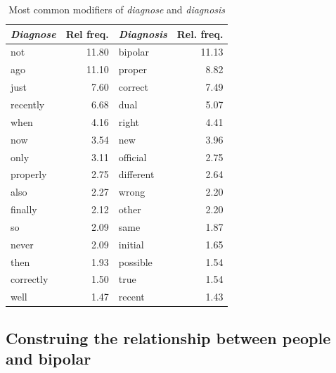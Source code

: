 \begin{table}[htb]
\begin{tabular}{lrlr}

\toprule
\emph{Diagnose}  & Rel freq.        & \emph{Diagnosis} & Rel. freq. \\
\midrule
not               &  11.80 & bipolar    &  11.13 \\
ago               &  11.10 & proper     &   8.82 \\
just              &   7.60 & correct    &   7.49 \\
recently          &   6.68 & dual       &   5.07 \\
when              &   4.16 & right      &   4.41 \\
now               &   3.54 & new        &   3.96 \\
only              &   3.11 & official   &   2.75 \\
properly          &   2.75 & different  &   2.64 \\
also              &   2.27 & wrong      &   2.20 \\
finally           &   2.12 & other      &   2.20 \\
so                &   2.09 & same       &   1.87 \\
never             &   2.09 & initial    &   1.65 \\
then              &   1.93 & possible   &   1.54 \\
correctly         &   1.50 & true       &   1.54 \\
well              &   1.47 & recent     &   1.43 \\
\bottomrule
\end{tabular}
\caption{Most common modifiers of \emph{diagnose} and \emph{diagnosis}}
\label{relfreq-diagnose-mods}
\end{table}



\subsection{Construing the relationship between people and bipolar} \label{subs:behave}
    

